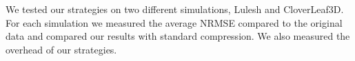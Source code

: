 We tested our strategies on two different simulations, Lulesh and CloverLeaf3D. 
%
For each simulation we measured the average NRMSE compared to the original data and compared our results with standard compression. 
%
We also measured the overhead of our strategies. 


